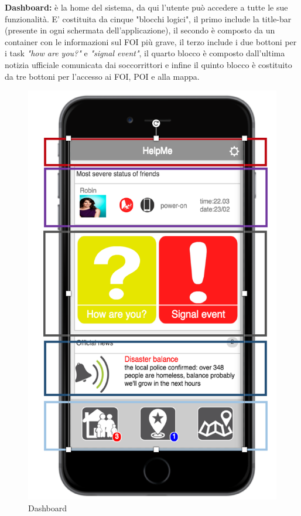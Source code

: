  \textbf{Dashboard:} è la home del sistema, da qui l'utente può accedere a tutte le sue funzionalità. E' costituita da cinque "blocchi logici", il primo include la title-bar (presente in ogni schermata dell'applicazione), il secondo è composto da un  container con le informazioni sul FOI più grave, il terzo include i due bottoni per i task \textit{"how are you?"} e \textit{"signal event"}, il quarto blocco è composto dall'ultima notizia ufficiale comunicata dai soccorrittori e infine il quinto blocco è costituito da tre bottoni per l'accesso ai FOI, POI e alla mappa.
   \begin{figure}[H]
   
	\centering
	\includegraphics[scale=0.7]{interfaccia/dash.png}
	\caption{Dashboard}
	\label{fig:logo_OSM}
\end{figure}


